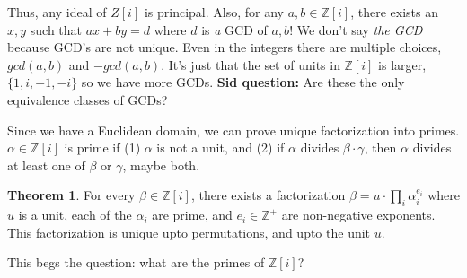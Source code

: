 \documentclass{book}
\theoremstyle{definition}
\newtheorem{theorem}{Theorem}
\newcommand{\Z}{\mathbb Z}
\begin{document}
Thus, any ideal of $Z[i]$ is principal. Also, for any $a, b  \in \Z[i]$, there
exists an $x, y$ such that $ax + by = d$ where $d$ is \emph{a} GCD of $a, b$!
We don't say \emph{the GCD} because GCD's are not unique. Even in the
integers there are multiple choices, $gcd(a, b)$ and $-gcd(a, b)$. It's just
that the set of units in $\Z[i]$ is larger, $\{1, i, -1, -i\}$ so we have
more GCDs.  \textbf{Sid question:} Are these the only equivalence classes of GCDs?


Since we have a Euclidean domain, we can prove unique factorization into primes.
$\alpha \in \Z[i]$ is prime if (1) $\alpha$ is not a unit, and
(2) if $\alpha$ divides $\beta \cdot \gamma$, then $\alpha$ divides at least
one of $\beta$ or $\gamma$, maybe both.

\begin{theorem}
For every $\beta \in \Z[i]$, there exists a factorization $\beta = u \cdot \prod_i \alpha_i^{e_i}$
where $u$ is a unit, each of the $\alpha_i$ are prime, and $e_i \in \Z^+$ are non-negative exponents.
This factorization is unique upto  permutations, and upto the unit $u$.
\end{theorem}

This begs the question: what are the primes of $\Z[i]$?
\end{document}
